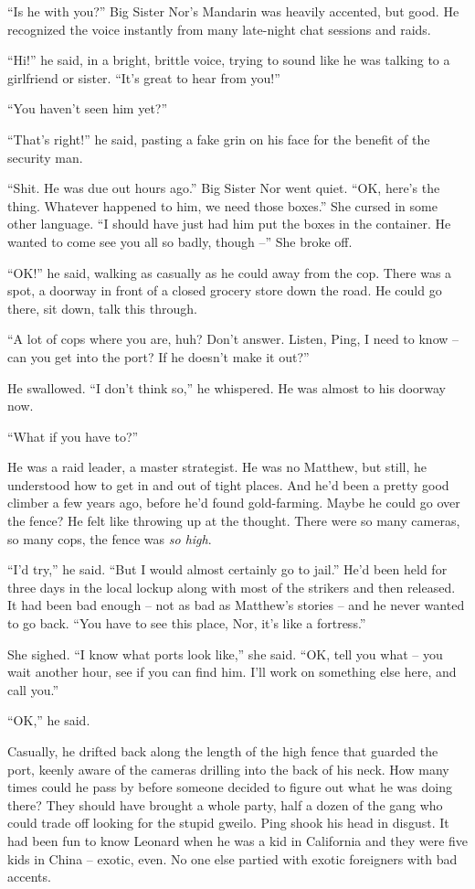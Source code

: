 ``Is he with you?'' Big Sister Nor's Mandarin was heavily accented,
but good. He recognized the voice instantly from many late-night
chat sessions and raids.

``Hi!'' he said, in a bright, brittle voice, trying to sound like he
was talking to a girlfriend or sister. ``It's great to hear from
you!''

``You haven't seen him yet?''

``That's right!'' he said, pasting a fake grin on his face for the
benefit of the security man.

``Shit. He was due out hours ago.'' Big Sister Nor went quiet. ``OK,
here's the thing. Whatever happened to him, we need those boxes.''
She cursed in some other language. ``I should have just had him put
the boxes in the container. He wanted to come see you all so badly,
though --'' She broke off.

``OK!'' he said, walking as casually as he could away from the cop.
There was a spot, a doorway in front of a closed grocery store down
the road. He could go there, sit down, talk this through.

``A lot of cops where you are, huh? Don't answer. Listen, Ping, I
need to know -- can you get into the port? If he doesn't make it
out?''

He swallowed. ``I don't think so,'' he whispered. He was almost to
his doorway now.

``What if you have to?''

He was a raid leader, a master strategist. He was no Matthew, but
still, he understood how to get in and out of tight places. And
he'd been a pretty good climber a few years ago, before he'd found
gold-farming. Maybe he could go over the fence? He felt like
throwing up at the thought. There were so many cameras, so many
cops, the fence was \emph{so high}.

``I'd try,'' he said. ``But I would almost certainly go to jail.'' He'd
been held for three days in the local lockup along with most of the
strikers and then released. It had been bad enough -- not as bad as
Matthew's stories -- and he never wanted to go back. ``You have to
see this place, Nor, it's like a fortress.''

She sighed. ``I know what ports look like,'' she said. ``OK, tell you
what -- you wait another hour, see if you can find him. I'll work
on something else here, and call you.''

``OK,'' he said.

Casually, he drifted back along the length of the high fence that
guarded the port, keenly aware of the cameras drilling into the
back of his neck. How many times could he pass by before someone
decided to figure out what he was doing there? They should have
brought a whole party, half a dozen of the gang who could trade off
looking for the stupid gweilo. Ping shook his head in disgust. It
had been fun to know Leonard when he was a kid in California and
they were five kids in China -- exotic, even. No one else partied
with exotic foreigners with bad accents.

